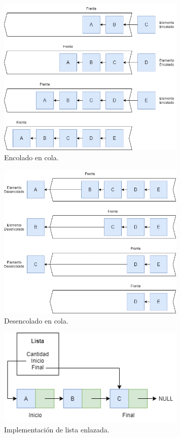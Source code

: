 \documentclass[titlepage,a4paper]{article}
\begin{document}
\begin{figure}[H]
\centering
\includegraphics[width=0.8\textwidth]{cola_encolado.png}
\caption{\label{fig:seq03}Encolado en cola.}
\end{figure}


\begin{figure}[H]
\centering
\includegraphics[width=0.8\textwidth]{cola_desencolado.png}
\caption{\label{fig:seq04}Desencolado en cola.}
\end{figure}


\begin{figure}[H]
\centering
\includegraphics[width=0.8\textwidth]{lista_general.png}
\caption{\label{fig:seq05}Implementación de lista enlazada.}
\end{figure}
\end{document}
